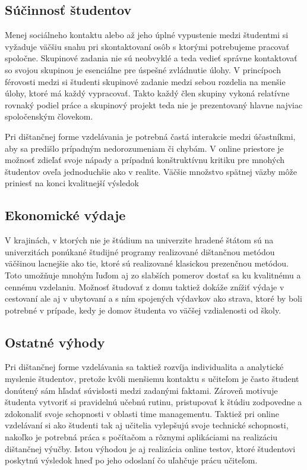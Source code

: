\documentclass[10pt,slovak,a4paper]{article}
\begin{document}
\subsection{Súčinnosť študentov}
	Menej sociálneho kontaktu alebo až jeho úplné vypustenie medzi študentmi si vyžaduje väčšiu snahu pri skontaktovaní osôb s ktorými potrebujeme pracovať spoločne. Skupinové zadania nie sú neobvyklé a teda vedieť správne kontaktovať so svojou skupinou je esenciálne pre úspešné zvládnutie úlohy. V princípoch férovosti medzi  si študenti skupinové zadanie medzi sebou rozdelia na menšie úlohy, ktoré má každý vypracovať. Takto každý člen skupiny vykoná relatívne rovnaký podiel práce a skupinový projekt teda nie je prezentovaný hlavne najviac spoločenským človekom. \cite{kumar2010pros}

	Pri dištančnej forme vzdelávania je potrebná častá interakcie medzi účastníkmi, aby sa predišlo prípadným nedorozumeniam či chybám. V online priestore je možnosť zdieľať svoje nápady a prípadnú konštruktívnu kritiku pre mnohých študentov oveľa jednoduchšie ako v realite. Väčšie množstvo spätnej väzby môže priniesť na konci kvalitnejší výsledok

\subsection{Ekonomické výdaje}
	V krajinách, v ktorých nie je štúdium na univerzite hradené štátom sú na univerzitách ponúkané študijné programy realizované dištančnou metódou väčšinou lacnejšie ako tie, ktoré sú realizované klasickou prezenčnou metódou. Toto umožňuje mnohým ľuďom aj zo slabších pomerov dostať sa ku kvalitnému a cennému vzdelaniu. Možnosť študovať z domu taktiež dokáže znížiť výdaje v cestovaní ale aj v ubytovaní a s ním spojených výdavkov ako strava, ktoré by boli potrebné v prípade, kedy je domov študenta vo väčšej vzdialenosti od školy. 

\subsection{Ostatné výhody}
	Pri dištančnej forme vzdelávania sa taktiež rozvíja individualita a analytické myslenie študentov, pretože kvôli menšiemu kontaktu s učiteľom je často študent donútený sám hľadať súvislosti medzi zadanými faktami. Zároveň motivuje študenta vytvoriť si pravidelnú učebnú rutinu, pristupovať k štúdiu zodpovedne a zdokonaliť svoje schopnosti v oblasti time managementu. Taktiež pri online vzdelávaní si ako študenti tak aj učitelia vylepšujú svoje technické schopnosti, nakoľko je potrebná práca s počítačom a rôznymi aplikáciami na realizáciu dištančnej výučby. Istou výhodou je aj realizácia online testov, ktoré študentovi poskytnú výsledok hneď po jeho odoslaní čo uľahčuje prácu učiteľom. 
\end{document}

